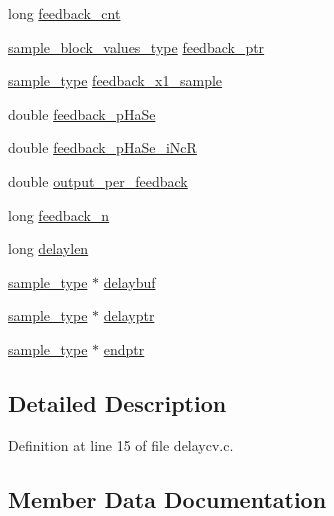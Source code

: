 \begin{DoxyCompactItemize}
\item 
long \hyperlink{structdelaycv__susp__struct_a2a1342084d482cc8438ee1e00500a4ec}{feedback\+\_\+cnt}
\item 
\hyperlink{sound_8h_a83d17f7b465d1591f27cd28fc5eb8a03}{sample\+\_\+block\+\_\+values\+\_\+type} \hyperlink{structdelaycv__susp__struct_a27355b28ad80523e127686c1a5628362}{feedback\+\_\+ptr}
\item 
\hyperlink{sound_8h_a3a9d1d4a1c153390d2401a6e9f71b32c}{sample\+\_\+type} \hyperlink{structdelaycv__susp__struct_a93e7ef381a7b92a7d4d48bd13dda2f70}{feedback\+\_\+x1\+\_\+sample}
\item 
double \hyperlink{structdelaycv__susp__struct_abfeff69c5f93de04040bd22f812222ef}{feedback\+\_\+p\+Ha\+Se}
\item 
double \hyperlink{structdelaycv__susp__struct_a1fbfd4ed465ec8387fd377c638d386db}{feedback\+\_\+p\+Ha\+Se\+\_\+i\+NcR}
\item 
double \hyperlink{structdelaycv__susp__struct_a6f1586274b69a00f214372ddf10a2948}{output\+\_\+per\+\_\+feedback}
\item 
long \hyperlink{structdelaycv__susp__struct_ad302c68fb9226c958b4d7908a09526e2}{feedback\+\_\+n}
\item 
long \hyperlink{structdelaycv__susp__struct_a088275d4d75aa777edf4146ecd0a80d9}{delaylen}
\item 
\hyperlink{sound_8h_a3a9d1d4a1c153390d2401a6e9f71b32c}{sample\+\_\+type} $\ast$ \hyperlink{structdelaycv__susp__struct_a2da8c8f108ebcffbdaa3437c9e0801a0}{delaybuf}
\item 
\hyperlink{sound_8h_a3a9d1d4a1c153390d2401a6e9f71b32c}{sample\+\_\+type} $\ast$ \hyperlink{structdelaycv__susp__struct_a5db63a760f9c9e7245a9bdf2835e73be}{delayptr}
\item 
\hyperlink{sound_8h_a3a9d1d4a1c153390d2401a6e9f71b32c}{sample\+\_\+type} $\ast$ \hyperlink{structdelaycv__susp__struct_a6811b5656751f531c2028c65ff18b07a}{endptr}
\end{DoxyCompactItemize}


\subsection{Detailed Description}


Definition at line 15 of file delaycv.\+c.



\subsection{Member Data Documentation}
